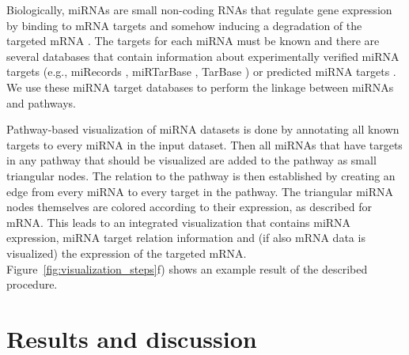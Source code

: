 \documentclass{bioinfo}
\begin{document}
Biologically, miRNAs are small non-coding RNAs that regulate gene expression by binding to mRNA
targets and somehow inducing a degradation of the targeted mRNA \citep{Bartel2004}. The targets for
each miRNA must be known and there are several databases that contain information about
experimentally verified miRNA targets (e.g., miRecords \citep[see][]{miRecords}, miRTarBase
\citep[see][]{miRTarBase}, TarBase \citep[see][]{TarBase}) or predicted miRNA targets
\citep{Alexiou2009}. We use these miRNA target databases to perform the linkage between miRNAs and
pathways.

Pathway-based visualization of miRNA datasets is done by annotating all known targets to every miRNA
in the input dataset. Then all miRNAs that have targets in any pathway that should be visualized are
added to the pathway as small triangular nodes. The relation to the pathway is then established by
creating an edge from every miRNA to every target in the pathway. The triangular miRNA nodes
themselves are colored according to their expression, as described for mRNA.  This leads to an
integrated visualization that contains miRNA expression, miRNA target relation information and (if
also mRNA data is visualized) the expression of the targeted
mRNA. Figure~\ref{fig:visualization_steps}f) shows an example result of the described procedure.


\section{Results and discussion}
\end{document}
